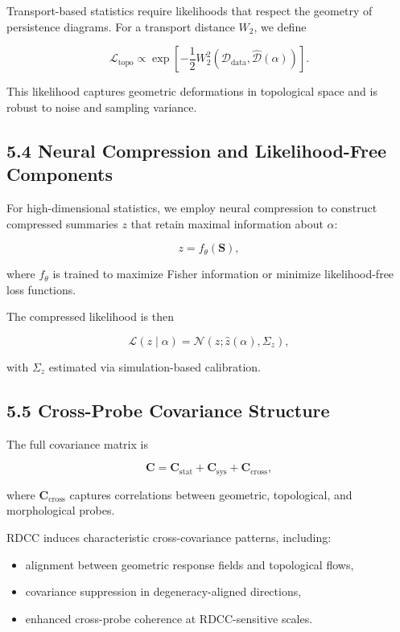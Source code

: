 \documentclass[11pt,a4paper]{article}
\begin{document}
Transport-based statistics require likelihoods that respect the geometry of 
persistence diagrams. For a transport distance $W_{2}$, we define


\[
    \mathcal{L}_{\mathrm{topo}}
    \propto
    \exp
    \left[
        -\frac{1}{2}
        W_{2}^{2}
        \left(
            \mathcal{D}_{\mathrm{data}},
            \widehat{\mathcal{D}}(\alpha)
        \right)
    \right].
\]



This likelihood captures geometric deformations in topological space and is 
robust to noise and sampling variance.

\subsection*{5.4 Neural Compression and Likelihood-Free Components}

For high-dimensional statistics, we employ neural compression to construct 
compressed summaries $z$ that retain maximal information about $\alpha$:


\[
    z = f_{\theta}(\mathbf{S}),
\]


where $f_{\theta}$ is trained to maximize Fisher information or minimize 
likelihood-free loss functions.

The compressed likelihood is then


\[
    \mathcal{L}(z \mid \alpha)
    =
    \mathcal{N}
    \left(
        z;
        \widehat{z}(\alpha),
        \Sigma_{z}
    \right),
\]


with $\Sigma_{z}$ estimated via simulation-based calibration.

\subsection*{5.5 Cross-Probe Covariance Structure}

The full covariance matrix is


\[
    \mathbf{C}
    =
    \mathbf{C}_{\mathrm{stat}}
    +
    \mathbf{C}_{\mathrm{sys}}
    +
    \mathbf{C}_{\mathrm{cross}},
\]


where $\mathbf{C}_{\mathrm{cross}}$ captures correlations between geometric, 
topological, and morphological probes.

RDCC induces characteristic cross-covariance patterns, including:

\begin{itemize}
    \item alignment between geometric response fields and topological flows,
    \item covariance suppression in degeneracy-aligned directions,
    \item enhanced cross-probe coherence at RDCC-sensitive scales.
\end{itemize}
\end{document}

